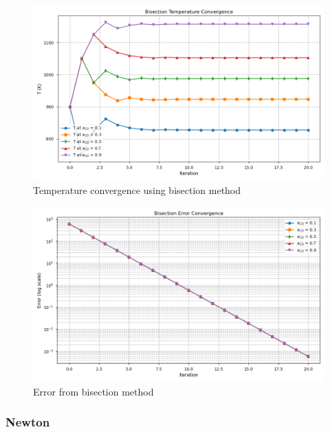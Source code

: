 \documentclass[10pt]{article}
\begin{document}
\begin{figure}[H]
    \centering
    \includegraphics[width=\imagewidth\textwidth]{figures/07_nonlinear/Bisection_Temperature_convergence.png}
    \caption{Temperature convergence using bisection method}
\end{figure}
\begin{figure}[H]
    \centering
    \includegraphics[width=\imagewidth\textwidth]{figures/07_nonlinear/bisection_error_convergence.png}
    \caption{Error from bisection method}
\end{figure}


\subsubsection{Newton}
\end{document}
